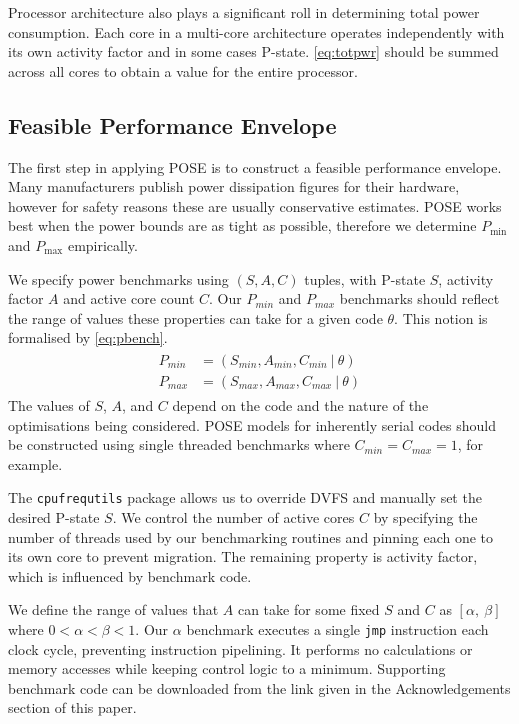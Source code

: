 Processor architecture also plays a significant roll in determining total power consumption.
Each core in a multi-core architecture operates independently with its own activity factor and in some cases P-state.
\autoref{eq:totpwr} should be summed across all cores to obtain a value for the entire processor.

\subsection{Feasible Performance Envelope}
\noindent
The first step in applying POSE is to construct a feasible performance envelope.
Many manufacturers publish power dissipation figures for their hardware, however for safety reasons these are usually conservative estimates.
POSE works best when the power bounds are as tight as possible, therefore we determine $P_{\min}$ and $P_{\max}$ empirically.

We specify power benchmarks using $(S,A,C)$ tuples, with P-state $S$, activity factor $A$ and active core count $C$.
Our $P_{min}$ and $P_{max}$ benchmarks should reflect the range of values these properties can take for a given code $\theta$.
This notion is formalised by \autoref{eq:pbench}.
\begin{align}
  \label{eq:pbench}
  \begin{split}
    P_{min} &= (S_{min}, A_{min}, C_{min}~\vert~\theta) \\
    P_{max} &= (S_{max}, A_{max}, C_{max}~\vert~\theta) 
  \end{split}
\end{align}
The values of $S$, $A$, and $C$ depend on the code and the nature of the optimisations being considered.
POSE models for inherently serial codes should be constructed using single threaded benchmarks where $C_{min} = C_{max} = 1$, for example.

The \texttt{cpufrequtils} package allows us to override DVFS and manually set the desired P-state $S$.
We control the number of active cores $C$ by specifying the number of threads used by our benchmarking routines and pinning each one to its own core to prevent migration.
The remaining property is activity factor, which is influenced by benchmark code.

We define the range of values that $A$ can take for some fixed $S$ and $C$ as $[\alpha,~\beta]$ where $0 < \alpha < \beta < 1$.
Our $\alpha$ benchmark executes a single \texttt{jmp} instruction each clock cycle, preventing instruction pipelining.
It performs no calculations or memory accesses while keeping control logic to a minimum.
Supporting benchmark code can be downloaded from the link given in the Acknowledgements section of this paper.

